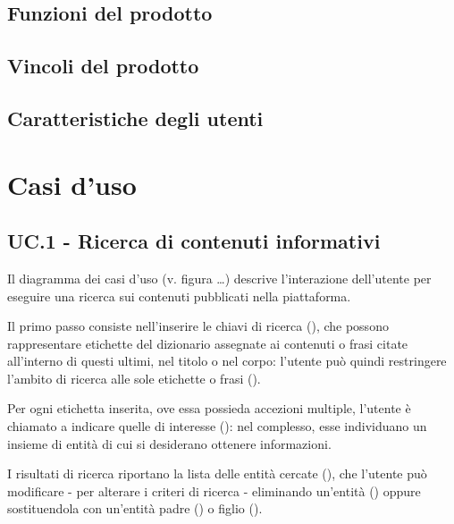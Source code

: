 \documentclass[10pt,a4paper,headinclude,footinclude,hidelinks]{scrreprt} %
\begin{document}
	\section{Funzioni del prodotto}
	\label{sec:stage:ar:intro:funzioni}

	\section{Vincoli del prodotto}
	\label{sec:stage:ar:intro:vincoli}

	\section{Caratteristiche degli utenti}
	\label{sec:stage:ar:intro:utenti}

	\chapter{Casi d'uso}
	\label{ch:stage:ar:uc}

	\section{UC.1 - Ricerca di contenuti informativi}
	\label{ch:stage:ar:uc:1}
	Il diagramma dei casi d'uso (v. figura \ldots) descrive l'interazione dell'utente per eseguire una ricerca sui contenuti pubblicati nella piattaforma.

	Il primo passo consiste nell'inserire le chiavi di ricerca (), che possono rappresentare etichette del dizionario assegnate ai contenuti o frasi citate all'interno di questi ultimi, nel titolo o nel corpo: l'utente può quindi restringere l'ambito di ricerca alle sole etichette o frasi ().

	Per ogni etichetta inserita, ove essa possieda accezioni multiple, l'utente è chiamato a indicare quelle di interesse (): nel complesso, esse individuano un insieme di entità di cui si desiderano ottenere informazioni.

	I risultati di ricerca riportano la lista delle entità cercate (), che l'utente può modificare - per alterare i criteri di ricerca - eliminando un'entità () oppure sostituendola con un'entità padre () o figlio ().
\end{document}
